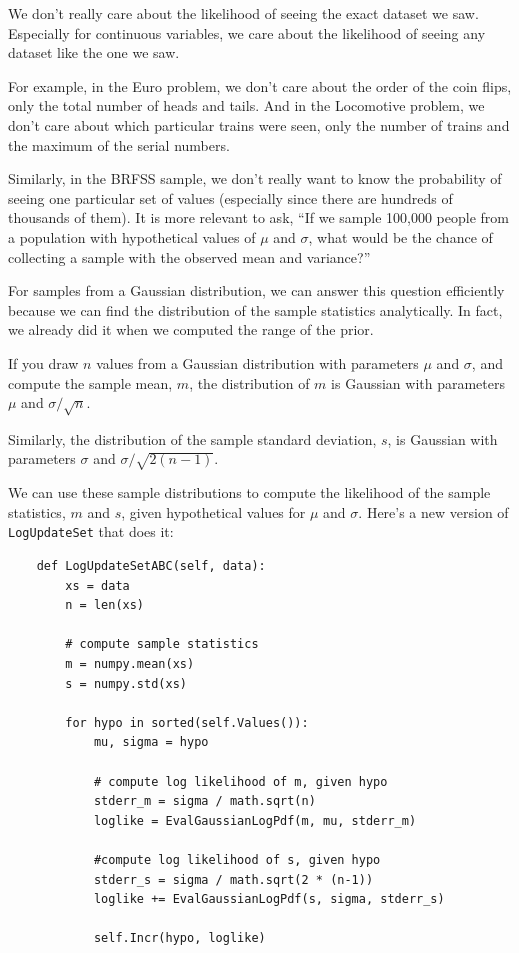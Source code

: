 \documentclass[12pt]{book}
\begin{document}
We don't really care about the likelihood of seeing the exact dataset
we saw.  Especially for continuous variables, we care about the
likelihood of seeing any dataset like the one we saw.

For example, in the Euro problem, we don't care about the order of
the coin flips, only the total number of heads and tails.  And in
the Locomotive problem, we don't care about which particular trains were
seen, only the number of trains and the maximum of the serial numbers.

Similarly, in the BRFSS sample, we don't really want to know the
probability of seeing one particular set of values (especially since
there are hundreds of thousands of them).  It is more
relevant to ask, ``If we sample 100,000 people from a population
with hypothetical values of $\mu$ and $\sigma$, what would be
the chance of collecting a sample with the observed mean and
variance?''

For samples from a Gaussian distribution, we can answer this question
efficiently because we can find the distribution of the sample
statistics analytically.  In fact, we already did it when we computed
the range of the prior.

If you draw $n$ values from a Gaussian distribution with parameters
$\mu$ and $\sigma$, and compute the sample mean, $m$, the
distribution of $m$ is Gaussian
with parameters $\mu$ and $\sigma / \sqrt{n}$.

Similarly, the distribution of the sample standard deviation, $s$, is
Gaussian with parameters $\sigma$ and $\sigma / \sqrt{2 (n-1)}$.

We can use these sample distributions to compute the likelihood of the
sample statistics, $m$ and $s$, given hypothetical values
for $\mu$ and $\sigma$.  Here's a new version of \verb"LogUpdateSet"
that does it:

\begin{verbatim}
    def LogUpdateSetABC(self, data):
        xs = data
        n = len(xs)

        # compute sample statistics
        m = numpy.mean(xs)
        s = numpy.std(xs)

        for hypo in sorted(self.Values()):
            mu, sigma = hypo

            # compute log likelihood of m, given hypo
            stderr_m = sigma / math.sqrt(n)
            loglike = EvalGaussianLogPdf(m, mu, stderr_m)

            #compute log likelihood of s, given hypo
            stderr_s = sigma / math.sqrt(2 * (n-1))
            loglike += EvalGaussianLogPdf(s, sigma, stderr_s)

            self.Incr(hypo, loglike)
\end{verbatim}
\end{document}
